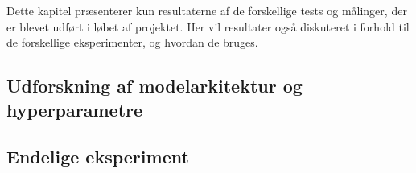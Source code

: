Dette kapitel præsenterer kun resultaterne af de forskellige tests og målinger, der er blevet udført i løbet af projektet.
Her vil resultater også diskuteret i forhold til de forskellige eksperimenter, og hvordan de bruges.


\subsection{Udforskning af modelarkitektur og hyperparametre} \label{ch5_1_design_af_eksperiment}



\subsection{Endelige eksperiment} \label{ch5_2_endelige_eksperiment}


